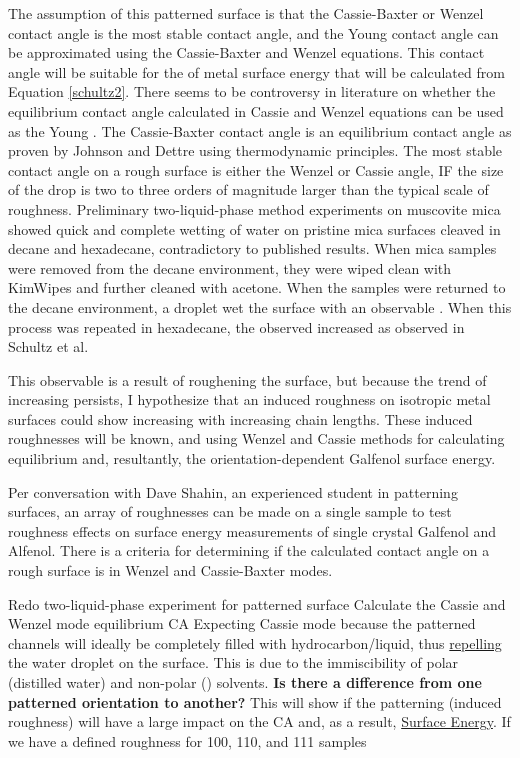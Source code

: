 \begin{outline}[enumerate]
	\2 The assumption of this patterned surface is that the Cassie-Baxter or Wenzel contact angle is the most stable contact angle, and the Young contact angle can be approximated using the Cassie-Baxter and Wenzel equations. This contact angle will be suitable for the of metal surface energy that will be calculated from Equation \ref{schultz2}.
		\3 There seems to be controversy in literature on whether the equilibrium contact angle calculated in Cassie and Wenzel equations can be used as the Young \ca.\cite{Attension2015,Marmur2009b,Bracco2013}
		\3 The Cassie-Baxter contact angle is an equilibrium contact angle as proven by Johnson and Dettre using thermodynamic principles.\cite{Johnson1964}
		\3 The most stable contact angle on a rough surface is either the Wenzel or Cassie angle, IF the size of the drop is two to three orders of magnitude larger than the typical scale of roughness.\cite{Meiron2004} %
	\2 Preliminary two-liquid-phase method experiments on muscovite mica showed quick and complete wetting of water on pristine mica surfaces cleaved in decane and hexadecane, contradictory to published results.\cite{Schultz1992} When mica samples were removed from the decane environment, they were wiped clean with KimWipes and further cleaned with acetone. When the samples were returned to the decane environment, a droplet wet the surface with an observable \ca. When this process was repeated in hexadecane, the observed \ca increased as observed in Schultz et al.\cite{Schultz1992} 
	
	This observable \ca is a result of roughening the surface, but because the trend of increasing \ca persists, I hypothesize that an induced roughness on isotropic metal surfaces could show increasing \ca[s] with increasing \nalk chain lengths. These induced roughnesses will be known, and using Wenzel\cite{Wenzel1936,Wenzel1949a} and Cassie\cite{Cassie1944} methods for calculating equilibrium \ca[s] and, resultantly, the orientation-dependent Galfenol surface energy. 
		
	\2 Per conversation with Dave Shahin, an experienced student in patterning surfaces, an array of roughnesses can be made on a single sample to test roughness effects on surface energy measurements of single crystal Galfenol and Alfenol. 
		\3 There is a criteria for determining if the calculated contact angle on a rough surface is in Wenzel and Cassie-Baxter modes. 
	
\1 Redo two-liquid-phase experiment for patterned surface
	\2 Calculate the Cassie and Wenzel mode equilibrium CA
		\3 Expecting Cassie mode because the patterned channels will ideally be completely filled with hydrocarbon/\nalk liquid, thus \underline{repelling} the water droplet on the surface. This is due to the immiscibility of polar (distilled water) and non-polar (\nalk) solvents. 
	\2 \textbf{Is there a difference from one patterned orientation to another?} This will show if the patterning (induced roughness) will have a large impact on the CA and, as a result, \underline{Surface Energy}. 
		\3 If we have a defined roughness for {100}, {110}, and {111} samples
\end{outline}

